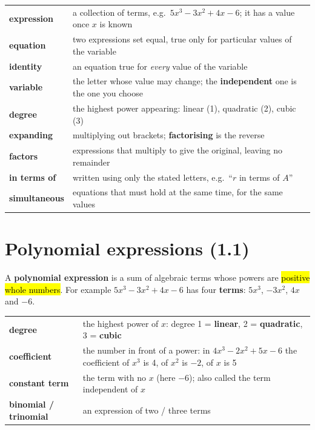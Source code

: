 \documentclass[11pt]{article}
\newcommand{\key}[1]{\hl{#1}}
\begin{document}
\begin{tabular}{@{}p{2.6cm}p{13.2cm}@{}}
\textbf{expression} & a collection of terms, e.g.\ $5x^{3}-3x^{2}+4x-6$; it has a value once $x$ is known\\
\textbf{equation} & two expressions set equal, true only for particular values of the variable\\
\textbf{identity} & an equation true for \emph{every} value of the variable\\
\textbf{variable} & the letter whose value may change; the \textbf{independent} one is the one you choose\\
\textbf{degree} & the highest power appearing: linear (1), quadratic (2), cubic (3)\\
\textbf{expanding} & multiplying out brackets; \textbf{factorising} is the reverse\\
\textbf{factors} & expressions that multiply to give the original, leaving no remainder\\
\textbf{in terms of} & written using only the stated letters, e.g.\ ``$r$ in terms of $A$''\\
\textbf{simultaneous} & equations that must hold at the same time, for the same values\\
\end{tabular}

\section{Polynomial expressions (1.1)}

A \textbf{polynomial expression} is a sum of algebraic terms whose powers are \key{positive whole numbers}. For example $5x^{3}-3x^{2}+4x-6$ has four \textbf{terms}: $5x^{3}$, $-3x^{2}$, $4x$ and $-6$.

\begin{tabular}{@{}p{3.3cm}p{12.5cm}@{}}
\textbf{degree} & the highest power of $x$: degree 1 = \textbf{linear}, 2 = \textbf{quadratic}, 3 = \textbf{cubic}\\
\textbf{coefficient} & the number in front of a power: in $4x^{3}-2x^{2}+5x-6$ the coefficient of $x^{3}$ is 4, of $x^{2}$ is $-2$, of $x$ is 5\\
\textbf{constant term} & the term with no $x$ (here $-6$); also called the term independent of $x$\\
\textbf{binomial / trinomial} & an expression of two / three terms\\
\end{tabular}
\end{document}
